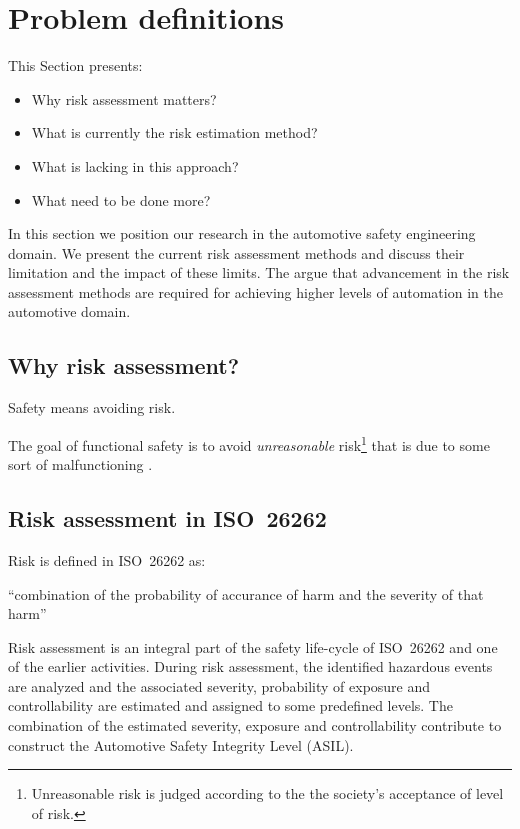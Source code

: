 \section{Problem definitions}
\label{sec:problem} %

This Section presents: 
\begin{itemize}
	\item Why risk assessment matters?
	\item What is currently the risk estimation method? 
	\item What is lacking in this approach? 
	\item What need to be done more? 
\end{itemize}

In this section we position our research in the automotive safety engineering domain. 
We present the current risk assessment methods and discuss their limitation and the impact of these limits.
The argue that advancement in the risk assessment methods are required for achieving higher levels of automation in the automotive domain. 

\subsection{Why risk assessment?}

Safety means avoiding risk. 

The goal of functional safety is to avoid \emph{unreasonable} risk\footnote{Unreasonable risk is judged according to the the society's acceptance of level of risk.} that is due to some sort of malfunctioning .


\subsection{Risk assessment in ISO~26262}
Risk is defined in ISO~26262 as:
\begin{definition}
	``combination of the probability of accurance of harm and the severity of that harm'' 
\end{definition}



Risk assessment is an integral part of the safety life-cycle of ISO~26262 and one of the earlier activities. 
During risk assessment, the identified hazardous events are analyzed and the associated severity, probability of exposure and controllability are estimated and assigned to some predefined levels. 
The combination of the estimated severity, exposure and controllability contribute to construct the Automotive Safety Integrity Level (ASIL). 





